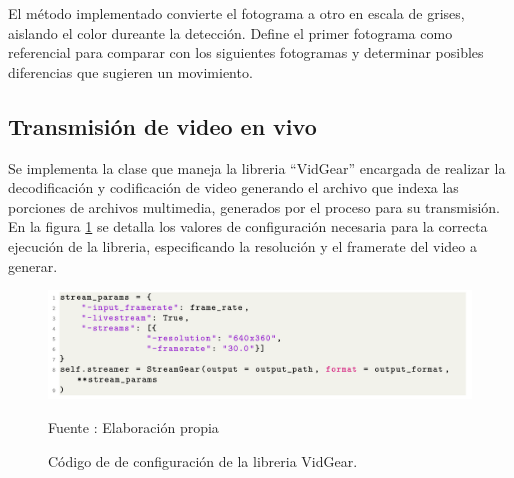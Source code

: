 El método implementado convierte el fotograma a otro en escala de grises, aislando el color dureante la detección. Define el primer fotograma como referencial para comparar con los siguientes fotogramas y determinar posibles diferencias que sugieren un movimiento.\\ 
\subsection{Transmisión de video en vivo}
Se implementa la clase que maneja la libreria ``VidGear'' encargada de realizar la decodificación y codificación de video generando el archivo que indexa las porciones de archivos multimedia, generados por el proceso para su transmisión. En la figura \ref{fig:vidgear} se detalla los valores de configuración necesaria para la correcta ejecución de la libreria, especificando la resolución y el framerate del video a generar.\\

\begin{figure}[H]
    \begin{center}
        \includegraphics[width=16cm]{img/capitulo_5/vidgear.png}
    \end{center}
    \begin{center}
        \caption{Código de de configuración de la libreria VidGear.}
        Fuente : Elaboración propia
        \label{fig:vidgear}
    \end{center}
\end{figure}
